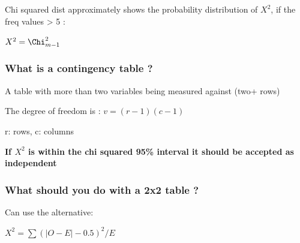 \documentclass[
]{article}
\begin{document}
Chi squared dist approximately shows the probability distribution of
\(X^2\), if the freq values \textgreater{} 5 :

\(X^2 = \Chi^2_{m-1}\)

\hypertarget{what-is-a-contingency-table}{%
\subsubsection{What is a contingency table
?}\label{what-is-a-contingency-table}}

A table with more than two variables being measured against (two+ rows)

The degree of freedom is : \(v= (r-1)(c-1)\)

r: rows, c: columns

\textbf{If \(X^2\) is within the chi squared 95\% interval it should be
accepted as independent}

\hypertarget{what-should-you-do-with-a-2x2-table}{%
\subsubsection{What should you do with a 2x2 table
?}\label{what-should-you-do-with-a-2x2-table}}

Can use the alternative:

\(X^2 = \sum (|O-E|-0.5)^2/E\)
\end{document}
